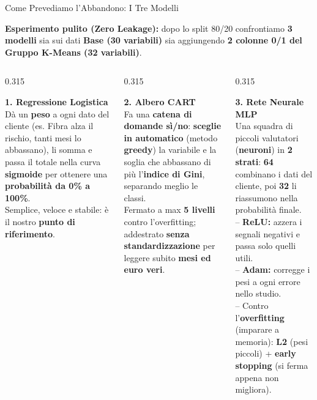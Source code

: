 \documentclass[aspectratio=169, 10pt]{beamer}
\newcommand{\card}[3]{%
    \colorbox{#1}{\parbox{\dimexpr#2-2\fboxsep\relax}{\raggedright #3}}%
}
\begin{document}
\begin{frame}{Come Prevediamo l'Abbandono: I Tre Modelli}
    \card{CardBlue}{\textwidth}{\footnotesize
        \textbf{\color{PrimaryNavy} Esperimento pulito (Zero Leakage):} dopo lo split 80/20 confrontiamo \textbf{3 modelli} sia sui dati \textbf{Base (30 variabili)} sia aggiungendo \textbf{2 colonne 0/1 del Gruppo K-Means (32 variabili)}.
    }

    \vspace{2.6mm}
    \begin{columns}[T, onlytextwidth]
        \begin{column}{0.315\textwidth}
            \card{CardBlue}{\linewidth}{\scriptsize
                \textbf{\color{PrimaryNavy}\small 1. Regressione Logistica}\\[3pt]
                Dà un \textbf{peso} a ogni dato del cliente (es. Fibra alza il rischio, tanti mesi lo abbassano), li somma e passa il totale nella curva \textbf{sigmoide} per ottenere una \textbf{probabilità da 0\% a 100\%}.\\[3pt]
                Semplice, veloce e stabile: è il nostro \textbf{punto di riferimento}.
            }
        \end{column}

        \begin{column}{0.315\textwidth}
            \card{CardGreen}{\linewidth}{\scriptsize
                \textbf{\color{AccentGreen}\small 2. Albero CART}\\[3pt]
                Fa una \textbf{catena di domande sì/no}: \textbf{sceglie in automatico} (metodo \textbf{greedy}) la variabile e la soglia che abbassano di più l'\textbf{indice di Gini}, separando meglio le classi.\\[3pt]
                Fermato a max \textbf{5 livelli} contro l'overfitting; addestrato \textbf{senza standardizzazione} per leggere subito \textbf{mesi ed euro veri}.
            }
        \end{column}

        \begin{column}{0.315\textwidth}
            \card{CardAmber}{\linewidth}{\scriptsize
                \textbf{\color{AccentAmber}\small 3. Rete Neurale MLP}\\[3pt]
                Una squadra di piccoli valutatori (\textbf{neuroni}) in \textbf{2 strati}: \textbf{64} combinano i dati del cliente, poi \textbf{32} li riassumono nella probabilità finale.\\[2pt]
                -- \textbf{ReLU:} azzera i segnali negativi e passa solo quelli utili.\\
                -- \textbf{Adam:} corregge i pesi a ogni errore nello studio.\\
                -- Contro l'\textbf{overfitting} (imparare a memoria): \textbf{L2} (pesi piccoli) + \textbf{early stopping} (si ferma appena non migliora).
            }
        \end{column}
    \end{columns}


\end{frame}
\end{document}
